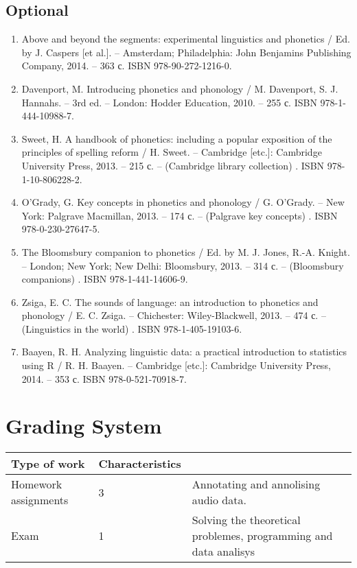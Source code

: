 \documentclass[a4paper]{article}
\begin{document}
\subsection{Optional}
\begin{enumerate}
\item  Above and beyond the segments: experimental linguistics and phonetics / Ed. by J. Caspers [et al.]. – Amsterdam; Philadelphia: John Benjamins Publishing Company, 2014. – 363 с.  ISBN 978-90-272-1216-0.
\item  Davenport, M. Introducing phonetics and phonology / M. Davenport, S. J. Hannahs. – 3rd ed. – London: Hodder Education, 2010. – 255 с.  ISBN 978-1-444-10988-7. 
\item  Sweet, H. A handbook of phonetics: including a popular exposition of the principles of spelling reform / H. Sweet. – Cambridge [etc.]: Cambridge University Press, 2013. – 215 с. – (Cambridge library collection) .  ISBN 978-1-10-806228-2.
\item  O'Grady, G. Key concepts in phonetics and phonology / G. O'Grady. – New York: Palgrave Macmillan, 2013. – 174 с. – (Palgrave key concepts) .  ISBN 978-0-230-27647-5.
\item  The Bloomsbury companion to phonetics / Ed. by M. J. Jones, R.-A. Knight. – London; New York; New Delhi: Bloomsbury, 2013. – 314 с. – (Bloomsbury companions) .  ISBN 978-1-441-14606-9.
\item  Zsiga, E. C. The sounds of language: an introduction to phonetics and phonology / E. C. Zsiga. – Chichester: Wiley-Blackwell, 2013. – 474 с. – (Linguistics in the world) .  ISBN 978-1-405-19103-6.
\item  Baayen, R. H. Analyzing linguistic data: a practical introduction to statistics using R / R. H. Baayen. – Cambridge [etc.]: Cambridge University Press, 2014. – 353 с. ISBN 978-0-521-70918-7.
\end{enumerate}
\section{Grading System}
\noindent 
\begin{center}
\begin{tabular}{|l|l|l|}
\hline
\textbf{Type of work} & \textbf{Characteristics} &  \\ \hline
Homework assignments  &  3 & Annotating and annolising audio data. \\ \hline
Exam & 1 & Solving the theoretical problemes, programming and data analisys \\ \hline
\end{tabular}
\end{center}
\end{document}
